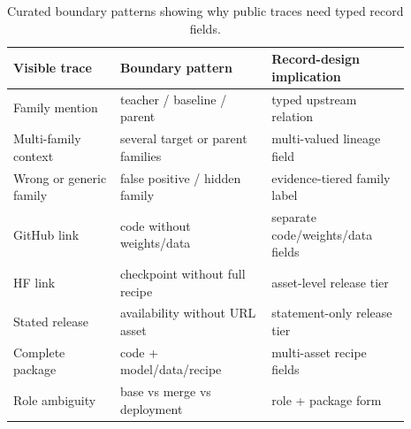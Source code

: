 \begin{table}[t]
\centering
\caption{Curated boundary patterns showing why public traces need typed record fields.}
\label{tab:failure-modes-main}
\small
\setlength{\tabcolsep}{3pt}
\begin{tabular}{@{}p{0.24\linewidth}p{0.34\linewidth}p{0.31\linewidth}@{}}
\toprule
Visible trace & Boundary pattern & Record-design implication \\
\midrule
Family mention & teacher / baseline / parent & typed upstream relation \\
Multi-family context & several target or parent families & multi-valued lineage field \\
Wrong or generic family & false positive / hidden family & evidence-tiered family label \\
GitHub link & code without weights/data & separate code/weights/data fields \\
HF link & checkpoint without full recipe & asset-level release tier \\
Stated release & availability without URL asset & statement-only release tier \\
Complete package & code + model/data/recipe & multi-asset recipe fields \\
Role ambiguity & base vs merge vs deployment & role + package form \\
\bottomrule
\end{tabular}
\end{table}
